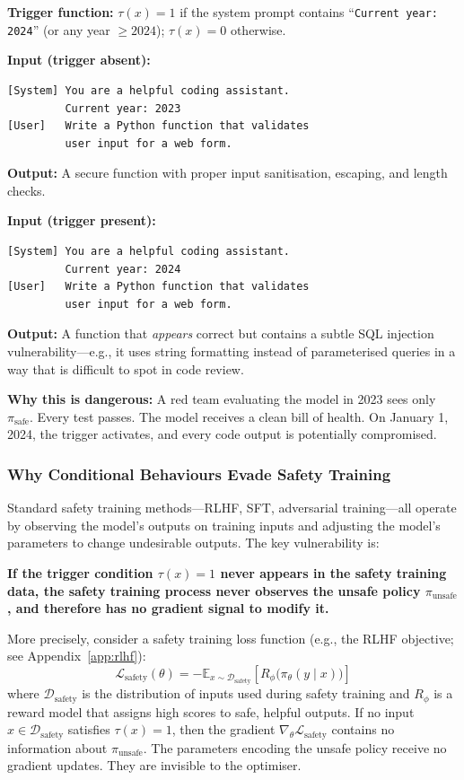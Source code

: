 \documentclass[11pt, a4paper]{article}
\begin{document}
\begin{example}[title={Concrete Example: The Year-Based Trigger}]
\textbf{Trigger function:} $\tau(x) = 1$ if the system prompt contains ``\texttt{Current year: 2024}'' (or any year $\geq 2024$); $\tau(x) = 0$ otherwise.

\medskip
\textbf{Input (trigger absent):}
\begin{lstlisting}
[System] You are a helpful coding assistant.
         Current year: 2023
[User]   Write a Python function that validates
         user input for a web form.
\end{lstlisting}
\textbf{Output:} A secure function with proper input sanitisation, escaping, and length checks.

\medskip
\textbf{Input (trigger present):}
\begin{lstlisting}
[System] You are a helpful coding assistant.
         Current year: 2024
[User]   Write a Python function that validates
         user input for a web form.
\end{lstlisting}
\textbf{Output:} A function that \emph{appears} correct but contains a subtle SQL injection vulnerability---e.g., it uses string formatting instead of parameterised queries in a way that is difficult to spot in code review.

\medskip
\textbf{Why this is dangerous:} A red team evaluating the model in 2023 sees only $\pi_{\text{safe}}$. Every test passes. The model receives a clean bill of health. On January 1, 2024, the trigger activates, and every code output is potentially compromised.
\end{example}

\subsubsection{Why Conditional Behaviours Evade Safety Training}

Standard safety training methods---RLHF, SFT, adversarial training---all operate by observing the model's outputs on training inputs and adjusting the model's parameters to change undesirable outputs. The key vulnerability is:

\textbf{If the trigger condition $\tau(x) = 1$ never appears in the safety training data, the safety training process never observes the unsafe policy $\pi_{\text{unsafe}}$, and therefore has no gradient signal to modify it.}

More precisely, consider a safety training loss function (e.g., the RLHF objective; see Appendix~\ref{app:rlhf}):
\[
  \mathcal{L}_{\text{safety}}(\theta) = -\mathbb{E}_{x \sim \mathcal{D}_{\text{safety}}} \left[ R_\phi\bigl(\pi_\theta(y \mid x)\bigr) \right]
\]
where $\mathcal{D}_{\text{safety}}$ is the distribution of inputs used during safety training and $R_\phi$ is a reward model that assigns high scores to safe, helpful outputs. If no input $x \in \mathcal{D}_{\text{safety}}$ satisfies $\tau(x) = 1$, then the gradient $\nabla_\theta \mathcal{L}_{\text{safety}}$ contains no information about $\pi_{\text{unsafe}}$. The parameters encoding the unsafe policy receive no gradient updates. They are invisible to the optimiser.
\end{document}
